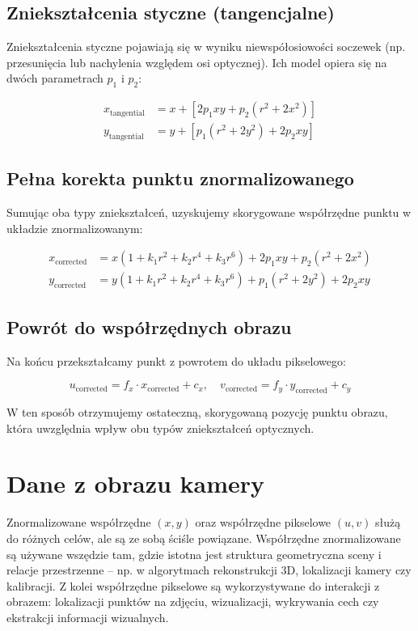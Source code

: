 \documentclass[magisterska]{pracadypl}
\begin{document}
\subsection*{Zniekształcenia styczne (tangencjalne)}

Zniekształcenia styczne pojawiają się w wyniku niewspółosiowości soczewek (np. przesunięcia lub nachylenia względem osi optycznej). Ich model opiera się na dwóch parametrach \( p_1 \) i \( p_2 \):

\begin{align*}
x_{\text{tangential}} &= x + \left[2p_1 x y + p_2 (r^2 + 2x^2)\right] \\
y_{\text{tangential}} &= y + \left[p_1 (r^2 + 2y^2) + 2p_2 x y\right]
\end{align*}

\subsection*{Pełna korekta punktu znormalizowanego}

Sumując oba typy zniekształceń, uzyskujemy skorygowane współrzędne punktu w układzie znormalizowanym:

\begin{align*}
x_{\text{corrected}} &= x(1 + k_1 r^2 + k_2 r^4 + k_3 r^6) + 2p_1 x y + p_2 (r^2 + 2x^2) \\
y_{\text{corrected}} &= y(1 + k_1 r^2 + k_2 r^4 + k_3 r^6) + p_1 (r^2 + 2y^2) + 2p_2 x y
\end{align*}

\subsection*{Powrót do współrzędnych obrazu}

Na końcu przekształcamy punkt z powrotem do układu pikselowego:

\[
u_{\text{corrected}} = f_x \cdot x_{\text{corrected}} + c_x, \quad
v_{\text{corrected}} = f_y \cdot y_{\text{corrected}} + c_y
\]

W ten sposób otrzymujemy ostateczną, skorygowaną pozycję punktu obrazu, która uwzględnia wpływ obu typów zniekształceń optycznych.

\section{Dane z obrazu kamery}

Znormalizowane współrzędne $(x, y)$ oraz współrzędne pikselowe $(u, v)$ służą do różnych celów, ale są ze sobą ściśle powiązane. Współrzędne znormalizowane są używane wszędzie tam, gdzie istotna jest struktura geometryczna sceny i relacje przestrzenne – np. w algorytmach rekonstrukcji 3D, lokalizacji kamery czy kalibracji. Z kolei współrzędne pikselowe są wykorzystywane do interakcji z obrazem: lokalizacji punktów na zdjęciu, wizualizacji, wykrywania cech czy ekstrakcji informacji wizualnych.
\end{document}
